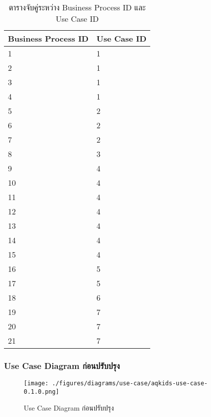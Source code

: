 \begin{table}[H]
\caption{ตารางจับคู่ระหว่าง Business Process ID และ Use Case ID}
\label{tab:bp-uc-mapping}
\begin{tabularx}{\textwidth}{|X|X|}
\hline
\multicolumn{1}{|X|}{\textbf{Business Process ID}} & \multicolumn{1}{c|}{\textbf{Use Case ID}} \\ \hline
1  & 1 \\ \hline
2  & 1 \\ \hline
3  & 1 \\ \hline
4  & 1 \\ \hline
5  & 2 \\ \hline
6  & 2 \\ \hline
7  & 2 \\ \hline
8  & 3 \\ \hline
9  & 4 \\ \hline
10 & 4 \\ \hline
11 & 4 \\ \hline
12 & 4 \\ \hline
13 & 4 \\ \hline
14 & 4 \\ \hline
15 & 4 \\ \hline
16 & 5 \\ \hline
17 & 5 \\ \hline
18 & 6 \\ \hline
19 & 7 \\ \hline
20 & 7 \\ \hline
21 & 7 \\ \hline
\end{tabularx}
\end{table}

\subsubsection{Use Case Diagram ก่อนปรับปรุง}

\begin{figure}[H]
\texttt{[image: ./figures/diagrams/use-case/aqkids-use-case-0.1.0.png]}
\caption{Use Case Diagram ก่อนปรับปรุง}
\label{fig:aqkids-use-case-draft}
\end{figure}


